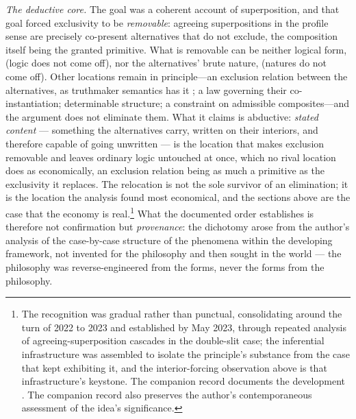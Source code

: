 \documentclass[11pt]{article}
\begin{document}
\textit{The deductive core.} The goal was a coherent account of superposition, and that goal forced exclusivity to be \emph{removable}: agreeing superpositions in the profile sense are precisely co-present alternatives that do not exclude, the composition itself being the granted primitive. What is removable can be neither logical form, (logic does not come off), nor the alternatives' brute nature, (natures do not come off). Other locations remain in principle---an exclusion relation between the alternatives, as truthmaker semantics has it \parencite{fine2017truthmaker}; a law governing their co-instantiation; determinable structure; a constraint on admissible composites---and the argument does not eliminate them. What it claims is abductive: \emph{stated content} --- something the alternatives carry, written on their interiors, and therefore capable of going unwritten --- is the location that makes exclusion removable and leaves ordinary logic untouched at once, which no rival location does as economically, an exclusion relation being as much a primitive as the exclusivity it replaces. The relocation is not the sole survivor of an elimination; it is the location the analysis found most economical, and the sections above are the case that the economy is real.\footnote{The recognition was gradual rather than punctual, consolidating around the turn of 2022 to 2023 and established by May 2023, through repeated analysis of agreeing-superposition cascades in the double-slit case; the inferential infrastructure was assembled to isolate the principle's substance from the case that kept exhibiting it, and the interior-forcing observation above is that infrastructure's keystone. The companion record documents the development \parencite{Aethus}. The companion record also preserves the author's contemporaneous assessment of the idea's significance.} What the documented order establishes is therefore not confirmation but \emph{provenance}: the dichotomy arose from the author's analysis of the case-by-case structure of the phenomena within the developing framework, not invented for the philosophy and then sought in the world --- the philosophy was reverse-engineered from the forms, never the forms from the philosophy.
\end{document}
